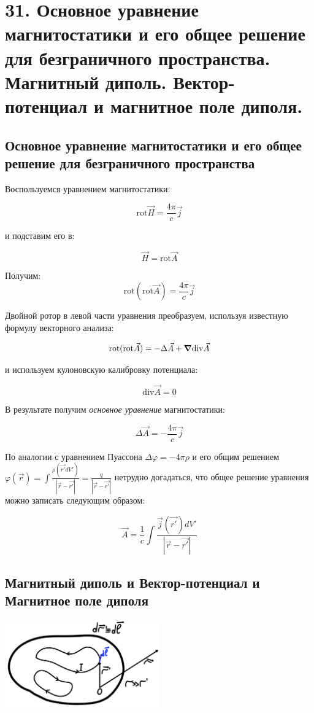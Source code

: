 \section*{31. Основное уравнение магнитостатики и его общее решение для
безграничного пространства. Магнитный диполь. Вектор-потенциал и
магнитное поле диполя.}
 
\subsection*{Основное уравнение магнитостатики и его общее решение для
безграничного пространства}

Воспользуемся уравнением магнитостатики:

\[
\mathrm{rot}\vec{H}=\frac{4\pi}{c}\vec{j}  
\]

и подставим его в:

\[
\vec{H}=\mathrm{rot}\vec{A}
\]

Получим:
\[
\mathrm{rot}(\mathrm{rot}\vec{A} )=\frac{4\pi}{c}\vec{j}  
\]

Двойной ротор в левой части уравнения преобразуем, используя известную формулу векторного анализа:

\[
\mathrm{rot}(\mathrm{rot}\vec{A} )=-\Delta \vec{A}+ \grad \mathrm{div}\vec{A} 
\]

и используем кулоновскую калибровку потенциала:

\[
\mathrm{div}\vec{A}=0 
\]

В результате получим \textit {основное уравнение} магнитостатики:

\[
\boxed{\Delta \vec{A}=-\frac{4\pi}{c}\vec{j} }
\]

По аналогии с уравнением Пуассона $\Delta\varphi=-4\pi\rho$ и его общим решением $\varphi(\vec{r})=\int \frac{\rho(\vec{r'}dV')}{|\vec{r}-\vec{r'}|}=\frac{q}{|\vec{r}-\vec{r'}|}$ нетрудно догадаться, что общее решение уравнения можно записать следующим образом:

\[
\boxed{\vec{A}=\frac{1}{c}\int \frac{\vec{j}(\vec{r'})dV'}{|\vec{r}-\vec{r'}|}  }
\]

\subsection*{Магнитный диполь и Вектор-потенциал и
Магнитное поле диполя}

\begin{center}
    \includegraphics[width=0.5\textwidth]{im/69.png}
\end{center}

